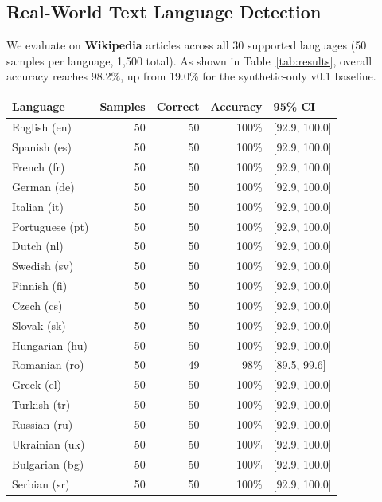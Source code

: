 \documentclass[11pt,a4paper]{article}
\begin{document}
\subsection{Real-World Text Language Detection}

We evaluate on \textbf{Wikipedia} articles across all 30 supported languages (50 samples per language, 1,500 total).
As shown in Table~\ref{tab:results}, overall accuracy reaches 98.2\%, up from 19.0\% for the synthetic-only v0.1 baseline.

\begin{table}[h]
\centering
\begin{tabular}{lrrrl}
\toprule
Language & Samples & Correct & Accuracy & 95\% CI \\
\midrule
English (en)     & 50 & 50 & 100\% & {[}92.9, 100.0{]} \\
Spanish (es)     & 50 & 50 & 100\% & {[}92.9, 100.0{]} \\
French (fr)      & 50 & 50 & 100\% & {[}92.9, 100.0{]} \\
German (de)      & 50 & 50 & 100\% & {[}92.9, 100.0{]} \\
Italian (it)     & 50 & 50 & 100\% & {[}92.9, 100.0{]} \\
Portuguese (pt)  & 50 & 50 & 100\% & {[}92.9, 100.0{]} \\
Dutch (nl)       & 50 & 50 & 100\% & {[}92.9, 100.0{]} \\
Swedish (sv)     & 50 & 50 & 100\% & {[}92.9, 100.0{]} \\
Finnish (fi)     & 50 & 50 & 100\% & {[}92.9, 100.0{]} \\
Czech (cs)       & 50 & 50 & 100\% & {[}92.9, 100.0{]} \\
Slovak (sk)      & 50 & 50 & 100\% & {[}92.9, 100.0{]} \\
Hungarian (hu)   & 50 & 50 & 100\% & {[}92.9, 100.0{]} \\
Romanian (ro)    & 50 & 49 & 98\% & {[}89.5, 99.6{]} \\
Greek (el)       & 50 & 50 & 100\% & {[}92.9, 100.0{]} \\
Turkish (tr)     & 50 & 50 & 100\% & {[}92.9, 100.0{]} \\
Russian (ru)     & 50 & 50 & 100\% & {[}92.9, 100.0{]} \\
Ukrainian (uk)   & 50 & 50 & 100\% & {[}92.9, 100.0{]} \\
Bulgarian (bg)   & 50 & 50 & 100\% & {[}92.9, 100.0{]} \\
Serbian (sr)     & 50 & 50 & 100\% & {[}92.9, 100.0{]} \\

\end{tabular}
\end{table}
\end{document}
